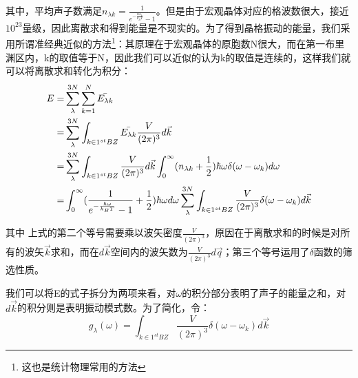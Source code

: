 \documentclass{ctexart}
\begin{document}
                其中，平均声子数满足$n_{\lambda k}=\frac{1}{e^{-\frac{\hbar\omega_k}{k_BT}}-1}$。但是由于宏观晶体对应的格波数很大，接近$10^{23}$量级，因此离散求和得到能量是不现实的。为了得到晶格振动的能量，我们采用所谓准经典近似的方法\footnote{这也是统计物理常用的方法}：其原理在于宏观晶体的原胞数N很大，而在第一布里渊区内，k的取值等于N，因此我们可以近似的认为k的取值是连续的，这样我们就可以将离散求和转化为积分：
                \begin{align}
                    \begin{split}
                        E=&\sum_\lambda^{3N}\sum_{k=1}^N\Bar{E_{\lambda k}}\\
                        =&\sum_\lambda^{3N}\int_{k\in 1^{st}BZ}\Bar{E_{\lambda k}}\frac{V}{(2\pi)^3}d\vec{k}\\
                        =&\sum_\lambda^{3N}\int_{k\in 1^{st}BZ}\frac{V}{(2\pi)^3}d\vec{k}\int_0^\infty (n_{\lambda k}+\frac{1}{2})\hbar\omega\delta(\omega-\omega_k)d\omega\\
                        =&\int_0^\infty (\frac{1}{e^{-\frac{\hbar\omega}{k_BT}}-1}+\frac{1}{2})\hbar\omega d\omega\sum_\lambda^{3N}\int_{k\in 1^{st}BZ}\frac{V}{(2\pi)^3}\delta(\omega-\omega_k)d\vec{k}
                    \end{split}
                \end{align}
                
                其中 上式的第二个等号需要乘以波矢密度$\frac{V}{(2\pi)^3}$，原因在于离散求和的时候是对所有的波矢$\vec{k}$求和，而在$d\vec{k}$空间内的波矢数为$\frac{V}{(2\pi)^3}d\vec{q}$；第三个等号运用了$\delta$函数的筛选性质。
                
                我们可以将E的式子拆分为两项来看，对$\omega$的积分部分表明了声子的能量之和，对$d\vec{k}$的积分则是表明振动模式数。为了简化，令：
                \begin{equation}
                    g_\lambda(\omega)=\int_{k\in 1^{st}BZ}\frac{V}{(2\pi)^3}\delta(\omega-\omega_k)d\vec{k}
                \end{equation}
                
\end{document}
